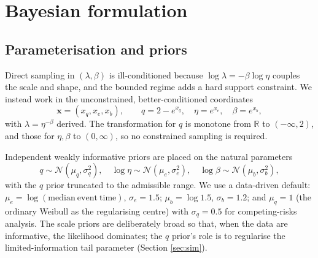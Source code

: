 \documentclass[ASNA,twocolumn]{USG}
\begin{document}
\section{Bayesian formulation}\label{sec:bayes}

\subsection{Parameterisation and priors}\label{sec:param}
Direct sampling in $(\lambda,\beta)$ is ill-conditioned because
$\log\lambda=-\beta\log\eta$ couples the scale and shape, and the bounded
regime adds a hard support constraint. We instead work in the unconstrained,
better-conditioned coordinates
\begin{equation}\label{eq:x}
\bm{x}=(x_q,x_e,x_b), \qquad
q=2-e^{x_q},\quad \eta=e^{x_e},\quad \beta=e^{x_b},
\end{equation}
with $\lambda=\eta^{-\beta}$ derived. The transformation for $q$ is
monotone from $\mathbb{R}$ to $(-\infty,2)$, and those for $\eta,\beta$ to
$(0,\infty)$, so no constrained sampling is required.

Independent weakly informative priors are placed on the natural parameters
\begin{equation}\label{eq:prior}
q\sim\mathcal{N}(\mu_q,\sigma_q^2),\quad
\log\eta\sim\mathcal{N}(\mu_e,\sigma_e^2),\quad
\log\beta\sim\mathcal{N}(\mu_b,\sigma_b^2),
\end{equation}
with the $q$ prior truncated to the admissible range. We use a data-driven
default: $\mu_e=\log(\mathrm{median\ event\ time})$, $\sigma_e=1.5$;
$\mu_b=\log 1.5$, $\sigma_b=1.2$; and $\mu_q=1$ (the ordinary Weibull as the
regularising centre) with $\sigma_q=0.5$ for competing-risks analysis. The
scale priors are deliberately broad so that, when the data are informative,
the likelihood dominates; the $q$ prior's role is to regularise the
limited-information tail parameter (Section \ref{sec:sim}).
\end{document}
